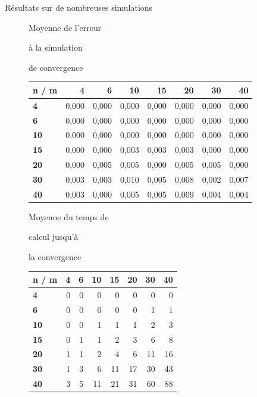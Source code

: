 \documentclass[10pt,xcolor=table,color={dvipsnames,usenames},ignorenonframetext,usepdftitle=false,french]{beamer}
\begin{document}
\begin{frame}{Résultats sur de nombreuses simulations}
\begin{figure}
\begin{minipage}{.4\textwidth}
\normalsize{Moyenne de l'erreur

à la simulation

de convergence}
\end{minipage}%
\begin{minipage}{.6\textwidth}

\begin{tabular}{>{\bfseries}l|r|r|r|r|r|r|r}
\hline
\textbf{n / m } & \textbf{4} & \textbf{6} & \textbf{10} & \textbf{15} & \textbf{20} & \textbf{30} & \textbf{40}\\
\hline
4 & 0,000 & 0,000 & 0,000 & 0,000 & 0,000 & 0,000 & 0,000\\
\hline
6 & 0,000 & 0,000 & 0,000 & 0,000 & 0,000 & 0,000 & 0,000\\
\hline
10 & 0,000 & 0,000 & 0,000 & 0,000 & 0,000 & 0,000 & 0,000\\
\hline
15 & 0,000 & 0,000 & 0,003 & 0,003 & 0,003 & 0,000 & 0,000\\
\hline
20 & 0,000 & 0,005 & 0,005 & 0,000 & 0,005 & 0,005 & 0,000\\
\hline
30 & 0,003 & 0,003 & 0,010 & 0,005 & 0,008 & 0,002 & 0,007\\
\hline
40 & 0,003 & 0,000 & 0,005 & 0,005 & 0,009 & 0,004 & 0,004\\
\hline
\end{tabular}
\end{minipage}
\end{figure}

\begin{figure}
\begin{minipage}{.4\textwidth}
\normalsize{Moyenne du temps de

calcul jusqu'à

la convergence}
\end{minipage}%
\begin{minipage}{.6\textwidth}

\begin{tabular}{>{\bfseries}l|r|r|r|r|r|r|r}
\hline
\textbf{n / m } & \textbf{4} & \textbf{6} & \textbf{10} & \textbf{15} & \textbf{20} & \textbf{30} & \textbf{40}\\
\hline
4 & 0 & 0 & 0 & 0 & 0 & 0 & 0\\
\hline
6 & 0 & 0 & 0 & 0 & 0 & 1 & 1\\
\hline
10 & 0 & 0 & 1 & 1 & 1 & 2 & 3\\
\hline
15 & 0 & 1 & 1 & 2 & 3 & 6 & 8\\
\hline
20 & 1 & 1 & 2 & 4 & 6 & 11 & 16\\
\hline
30 & 1 & 3 & 6 & 11 & 17 & 30 & 43\\
\hline
40 & 3 & 5 & 11 & 21 & 31 & 60 & 88\\
\hline
\end{tabular}

\end{minipage}
\end{figure}

\normalsize

\end{frame}
\end{document}
